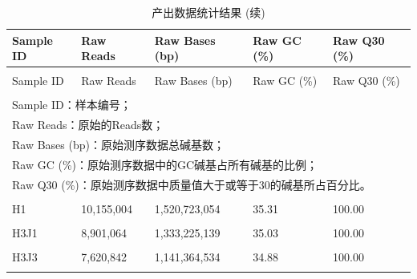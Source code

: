 \documentclass[
  a4paper,
  titlepage]{article}
\begin{document}
\begin{longtable}[t]{lllll}
\caption{\label{tab:rawdata-table}产出数据统计结果}\\
\toprule
Sample ID & Raw Reads & Raw Bases (bp) & Raw GC (\%) & Raw Q30 (\%)\\
\midrule
\endfirsthead
\caption[]{\label{tab:rawdata-table}产出数据统计结果 (续)}\\
\toprule
Sample ID & Raw Reads & Raw Bases (bp) & Raw GC (\%) & Raw Q30 (\%)\\
\midrule
\endhead
\hline
\endfoot
\bottomrule
\multicolumn{5}{l}{\rule{0pt}{1em}\textit{注：}}\\
\multicolumn{5}{l}{\rule{0pt}{1em}Sample ID：样本编号；}\\
\multicolumn{5}{l}{\rule{0pt}{1em}Raw Reads：原始的Reads数；}\\
\multicolumn{5}{l}{\rule{0pt}{1em}Raw Bases (bp)：原始测序数据总碱基数；}\\
\multicolumn{5}{l}{\rule{0pt}{1em}Raw GC (\%)：原始测序数据中的GC碱基占所有碱基的比例；}\\
\multicolumn{5}{l}{\rule{0pt}{1em}Raw Q30 (\%)：原始测序数据中质量值大于或等于30的碱基所占百分比。}\\
\endlastfoot
\cellcolor{gray!6}{FJMS} & \cellcolor{gray!6}{45,151,054} & \cellcolor{gray!6}{6,762,077,180} & \cellcolor{gray!6}{34.58} & \cellcolor{gray!6}{100.00}\\
 
H1 & 10,155,004 & 1,520,723,054 & 35.31 & 100.00\\
 
\cellcolor{gray!6}{H3} & \cellcolor{gray!6}{6,398,326} & \cellcolor{gray!6}{958,307,115} & \cellcolor{gray!6}{34.41} & \cellcolor{gray!6}{100.00}\\
 
H3J1 & 8,901,064 & 1,333,225,139 & 35.03 & 100.00\\
 
\cellcolor{gray!6}{H3J2} & \cellcolor{gray!6}{9,306,464} & \cellcolor{gray!6}{1,393,857,776} & \cellcolor{gray!6}{35.09} & \cellcolor{gray!6}{100.00}\\
 
H3J3 & 7,620,842 & 1,141,364,534 & 34.88 & 100.00\\
 
\cellcolor{gray!6}{H3J4} & \cellcolor{gray!6}{8,923,024} & \cellcolor{gray!6}{1,336,401,487} & \cellcolor{gray!6}{35.90} & \cellcolor{gray!6}{100.00}\\
 

\end{longtable}
\end{document}
